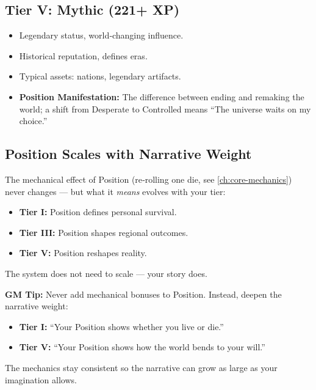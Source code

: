 \subsection{Tier V: Mythic (221+ XP)}
\label{sec:tier-v}
\begin{itemize}
\item Legendary status, world‑changing influence.
\item Historical reputation, defines eras.
\item Typical assets: nations, legendary artifacts.
\item \textbf{Position Manifestation:} The difference between ending and remaking the world; a shift from Desperate to Controlled means “The universe waits on my choice.”
\end{itemize}

\subsection{Position Scales with Narrative Weight}
\label{sec:position-narrative-weight}
The mechanical effect of Position (re‑rolling one die, see \ref{ch:core-mechanics}) never changes — but what it \textit{means} evolves with your tier:
\begin{itemize}
\item \textbf{Tier I:} Position defines personal survival.
\item \textbf{Tier III:} Position shapes regional outcomes.
\item \textbf{Tier V:} Position reshapes reality.
\end{itemize}
The system does not need to scale — your story does.

\begin{tcolorbox}[colback=blue!5!white, colframe=blue!75!black, boxrule=0.5pt, arc=2mm]
\textbf{GM Tip:} Never add mechanical bonuses to Position. Instead, deepen the narrative weight:
\begin{itemize}
\item \textbf{Tier I:} “Your Position shows whether you live or die.”
\item \textbf{Tier V:} “Your Position shows how the world bends to your will.”
\end{itemize}
The mechanics stay consistent so the narrative can grow as large as your imagination allows.
\end{tcolorbox}

\newpage
